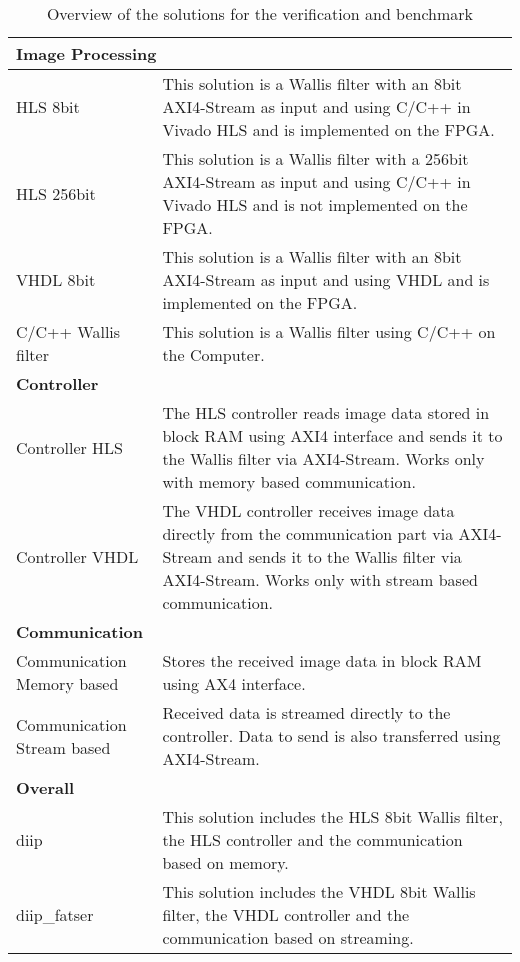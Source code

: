 \begin{table}[tb!]
    \centering
    \begin{tabular}{p{3.8cm} p{10cm}}
        \toprule
        \multicolumn{2}{l}{\textbf{Image Processing}}\\
        \toprule
        HLS 8bit & This solution is a Wallis filter with an 8bit AXI4-Stream as input and using C/C++ in Vivado HLS and is implemented on the FPGA.\\
        \midrule
        HLS 256bit & This solution is a Wallis filter with a 256bit AXI4-Stream as input and using C/C++ in Vivado HLS and is not implemented on the FPGA.\\
        \midrule
        VHDL 8bit & This solution is a Wallis filter with an 8bit AXI4-Stream as input and using VHDL and is implemented on the FPGA.\\
        \midrule
        C/C++ Wallis filter & This solution is a Wallis filter using C/C++ on the Computer.\\
        \toprule
        \multicolumn{2}{l}{\textbf{Controller}}\\
        \toprule
        Controller HLS &  The HLS controller reads image data stored in block RAM using AXI4 interface and sends it to the Wallis filter via AXI4-Stream. Works only with memory based communication. \\
        \midrule
        Controller VHDL & The VHDL controller receives image data directly from the communication part via AXI4-Stream and sends it to the Wallis filter via AXI4-Stream. Works only with stream based communication. \\
        \toprule
        \multicolumn{2}{l}{\textbf{Communication}}\\
        \toprule
        Communication Memory based & Stores the received image data in block RAM using AX4 interface. \\
        \midrule
        Communication Stream based & Received data is streamed directly to the controller. Data to send is also transferred using AXI4-Stream. \\
        \toprule
        \multicolumn{2}{l}{\textbf{Overall}}\\
        \toprule
        diip & This solution includes the HLS 8bit Wallis filter, the HLS controller and the communication based on memory. \\
        \midrule
        diip\_fatser & This solution includes the VHDL 8bit Wallis filter, the VHDL controller and the communication based on streaming. \\
        \bottomrule
    \end{tabular}
    \caption{Overview of the solutions for the verification and benchmark}
    \label{tab:ver:overview}
\end{table}

